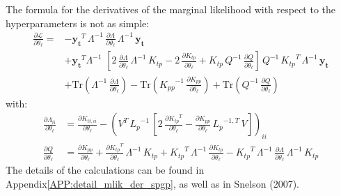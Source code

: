 \documentclass[11pt,a4paper]{article}
\newcommand\rapp[1]{Appendix\;\ref{#1}}
\newcommand{\tr}{\text{Tr}}
\numberwithin{equation}{section}
\begin{document}
The formula for the derivatives of the marginal likelihood with respect to the hyperparameters is not as simple:
\begin{align}
\frac{\partial \mathcal{L}}{\partial \theta_\ell} =
  &-\mathbf{y_t}^T\,\Lambda^{-1}\,\frac{\partial \Lambda}{\partial \theta_\ell}\,\Lambda^{-1}\,\mathbf{y_t} \nonumber \\
  &+\mathbf{y_t}^T\Lambda^{-1}\,\,\left[2\,\frac{\partial \Lambda}{\partial \theta_\ell}\,\Lambda^{-1}\,K_{tp} - 2\,\frac{\partial K_{tp}}{\partial \theta_\ell} + K_{tp}\,Q^{-1}\,\frac{\partial Q}{\partial \theta_\ell}\right]\,Q^{-1}\,{K_{tp}}^T\,\Lambda^{-1}\,\mathbf{y_t} \nonumber \\
  &+\tr\left(\Lambda^{-1}\,\frac{\partial \Lambda}{\partial \theta_\ell}\right) - \tr\left({K_{pp}}^{-1}\,\frac{\partial K_{pp}}{\partial \theta_\ell}\right) + \tr\left(Q^{-1}\,\frac{\partial Q}{\partial \theta_\ell}\right)
\end{align}
with:
\begin{align}
\frac{\partial \Lambda_{ii}}{\partial \theta_\ell} &= \frac{\partial K_{tt,ii}}{\partial \theta_\ell} - \left(V^T\,{L_p}^{-1}\,\left[2\,\frac{\partial {K_{tp}}^T}{\partial \theta_\ell} - \frac{\partial K_{pp}}{\partial \theta_\ell}\,{L_{p}}^{-1,T}\,V\right]\right)_{ii} \\
\frac{\partial Q}{\partial \theta_\ell} &= \frac{\partial K_{pp}}{\partial \theta_\ell} + \frac{\partial {K_{tp}}^T}{\partial \theta_\ell}\,\Lambda^{-1}\,K_{tp} + {K_{tp}}^T\,\Lambda^{-1}\,\frac{\partial K_{tp}}{\partial \theta_\ell} - {K_{tp}}^T\,\Lambda^{-1}\,\frac{\partial \Lambda}{\partial \theta_\ell}\,\Lambda^{-1}\,K_{tp}
\end{align}
The details of the calculations can be found in \rapp{APP:detail_mlik_der_spgp}, as well as in Snelson (2007).
\end{document}
